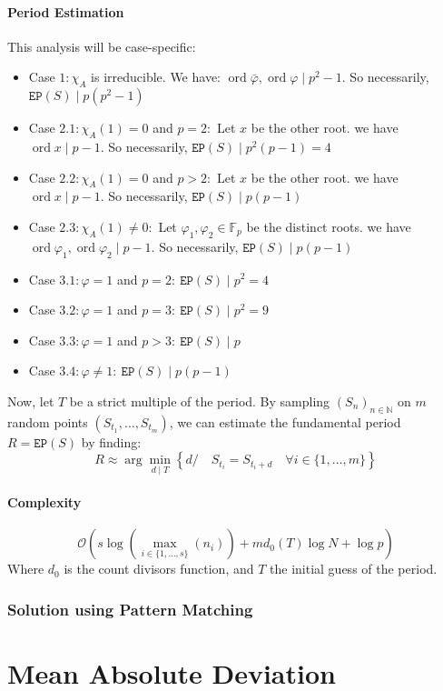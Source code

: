 \documentclass[]{article}
\DeclareMathOperator{\ord}{ord}
\begin{document}
\subsection{Period Estimation}
This analysis will be case-specific:
\begin{itemize}
	\item Case $1: \chi_A$ is irreducible. We have: $\ord \bar\varphi,\ord \varphi \mid p^2-1.$
	\newline
	So necessarily, $\mathtt{EP}(S) \mid p(p^2-1) $
	\item Case $2.1: \chi_A(1)=0$ and $p=2:$ Let $x$ be the other root.
	\newline we have $\ord x \mid p-1.$ So necessarily, $\mathtt{EP}(S) \mid p^2(p-1) = 4 $
	\item Case $2.2: \chi_A(1)=0$ and $p>2: $
	 Let $x$ be the other root. 
	 \newline 
	 we have $\ord x \mid p-1.$ So necessarily, $\mathtt{EP}(S) \mid p(p-1)$
	\item Case $2.3: \chi_A(1)\neq 0: $
	Let $\varphi_1,\varphi_2\in\mathbb{F}_p$ be the distinct roots.
	\newline
	we have $\ord \varphi_1,\ord \varphi_2 \mid p-1.$ So necessarily, $\mathtt{EP}(S) \mid p(p-1)$
	\item Case $3.1: \varphi = 1$ and $p=2: \ \mathtt{EP}(S) \mid p^2=4$
	\item Case $3.2: \varphi = 1$ and $p=3: \ \mathtt{EP}(S) \mid p^2=9$
	\item Case $3.3: \varphi = 1$ and $p>3: \ \mathtt{EP}(S) \mid p$
	\item Case $3.4: \varphi \neq 1: \ \mathtt{EP}(S) \mid p(p-1)$
\end{itemize}
Now, let $T$ be a strict multiple of the period. By sampling $(S_n)_{n\in\mathbb{N}}$ on $m$ random points $(S_{t_1},\dots,S_{t_m})$, we can estimate the fundamental period $R=\mathtt{EP}(S)$ by finding:
\begin{equation}\tag{2}
	\boxed{R\approx \arg\min_{d \mid T}\left\{d/\quad S_{t_i} = S_{t_i+d} \quad \forall i\in\{1,\dots,m\}\right\}}
\end{equation}
\subsection{Complexity}
$$
\mathcal{O}\left(s\log\left(\max_{i\in\{1,\dots,s\}}(n_{i})\right)+md_0(T)\log N + \log p\right)
$$
Where $d_0$ is the count divisors function, and $T$ the initial guess of the period. 
\pagebreak
\section{Solution using Pattern Matching}
\pagebreak
\part{Mean Absolute Deviation}
\end{document}
